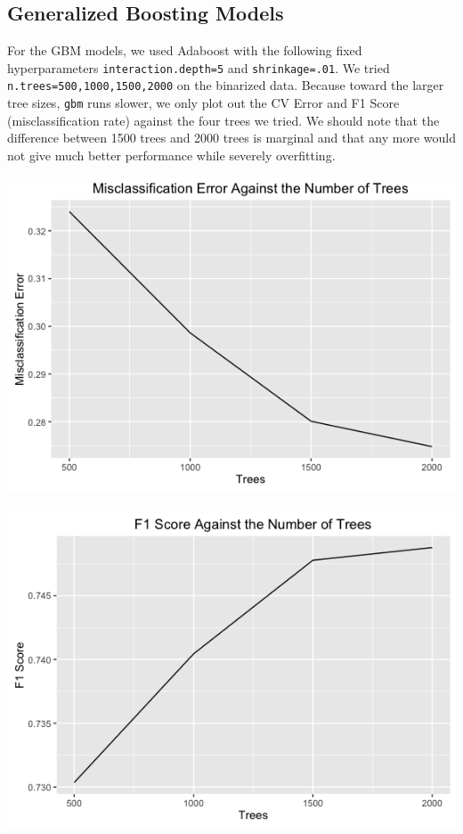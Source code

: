 \documentclass{article}
\begin{document}
\subsection{Generalized Boosting Models}
For the GBM models, we used Adaboost with the following fixed hyperparameters \texttt{interaction.depth=5} and \texttt{shrinkage=.01}. We tried \texttt{n.trees=500,1000,1500,2000} on the binarized data. Because toward the larger tree sizes, \texttt{gbm} runs slower, we only plot out the CV Error and F1 Score (misclassification rate) against the four trees we tried. We should note that the difference between 1500 trees and 2000 trees is marginal and that any more would not give much better performance while severely overfitting. \\

\centerline{\includegraphics[scale=.35]{diagrams/4gbm.png} ~~~~~~~~~~ \includegraphics[scale=.35]{diagrams/5gbm.png}}
\end{document}
